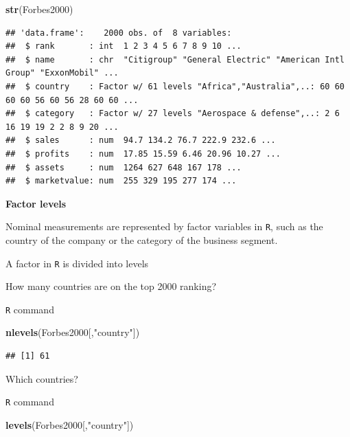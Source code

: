 \documentclass[]{article}
\newenvironment{Shaded}{\begin{snugshade}}{\end{snugshade}}
\newcommand{\KeywordTok}[1]{\textcolor[rgb]{0.13,0.29,0.53}{\textbf{{#1}}}}
\newcommand{\StringTok}[1]{\textcolor[rgb]{0.31,0.60,0.02}{{#1}}}
\newcommand{\NormalTok}[1]{{#1}}
\numberwithin{equation}{section}
\begin{document}
\begin{Shaded}
\begin{Highlighting}[]
\KeywordTok{str}\NormalTok{(Forbes2000)}
\end{Highlighting}
\end{Shaded}

\begin{verbatim}
## 'data.frame':    2000 obs. of  8 variables:
##  $ rank       : int  1 2 3 4 5 6 7 8 9 10 ...
##  $ name       : chr  "Citigroup" "General Electric" "American Intl Group" "ExxonMobil" ...
##  $ country    : Factor w/ 61 levels "Africa","Australia",..: 60 60 60 60 56 60 56 28 60 60 ...
##  $ category   : Factor w/ 27 levels "Aerospace & defense",..: 2 6 16 19 19 2 2 8 9 20 ...
##  $ sales      : num  94.7 134.2 76.7 222.9 232.6 ...
##  $ profits    : num  17.85 15.59 6.46 20.96 10.27 ...
##  $ assets     : num  1264 627 648 167 178 ...
##  $ marketvalue: num  255 329 195 277 174 ...
\end{verbatim}

\textbf{Factor levels}

Nominal measurements are represented by factor variables in \texttt{R},
such as the country of the company or the category of the business
segment.

A factor in \texttt{R} is divided into levels

How many countries are on the top 2000 ranking?

\texttt{R} command

\begin{Shaded}
\begin{Highlighting}[]
\KeywordTok{nlevels}\NormalTok{(Forbes2000[,}\StringTok{"country"}\NormalTok{])}
\end{Highlighting}
\end{Shaded}

\begin{verbatim}
## [1] 61
\end{verbatim}

Which countries?

\texttt{R} command

\begin{Shaded}
\begin{Highlighting}[]
\KeywordTok{levels}\NormalTok{(Forbes2000[,}\StringTok{"country"}\NormalTok{])}
\end{Highlighting}
\end{Shaded}
\end{document}
